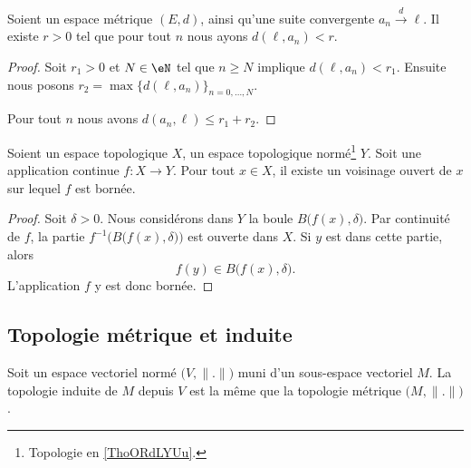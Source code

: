 \begin{proposition}      \label{PROPooUXDJooCrWBbd}
	Soient un espace métrique \( (E,d)\), ainsi qu'une suite convergente \( a_n\stackrel{d}{\longrightarrow}\ell\). Il existe \( r>0\) tel que pour tout \( n\) nous ayons \( d(\ell, a_n)<r\).
\end{proposition}

\begin{proof}
	Soit \( r_1>0\) et \( N\in \eN\) tel que \( n\geq N\) implique \( d(\ell,a_n)<r_1\). Ensuite nous posons \( r_2=\max\{ d(\ell,a_n) \}_{n=0,\ldots, N}\).

	Pour tout \( n\) nous avons \( d(a_n,\ell)\leq r_1+r_2\).
\end{proof}

\begin{proposition}		\label{PROPooNOHQooTqBQLk}
	Soient un espace topologique \( X\), un espace topologique normé\footnote{Topologie en \ref{ThoORdLYUu}.} \( Y\). Soit une application continue \(f \colon X\to Y  \). Pour tout \( x\in X\), il existe un voisinage ouvert de \( x\) sur lequel \( f\) est bornée.
\end{proposition}

\begin{proof}
	Soit \( \delta>0\). Nous considérons dans \( Y\) la boule \( B\big( f(x),\delta \big)\). Par continuité de \( f\), la partie \( f^{-1}\Big( B\big( f(x),\delta \big) \Big)\) est ouverte dans \( X\). Si \( y\) est dans cette partie, alors
	\begin{equation}
		f(y)\in B\big( f(x),\delta \big).
	\end{equation}
	L'application \( f\) y est donc bornée.
\end{proof}

\subsection{Topologie métrique et induite}

\begin{lemma}       \label{LEMooKDMYooMIcFRI}
	Soit un espace vectoriel normé \( \big( V,\| . \| \big)   \) muni d'un sous-espace vectoriel \( M\). La topologie induite de \( M\) depuis \( V\) est la même que la topologie métrique \( \big( M,\| . \| \big)\).
\end{lemma}

